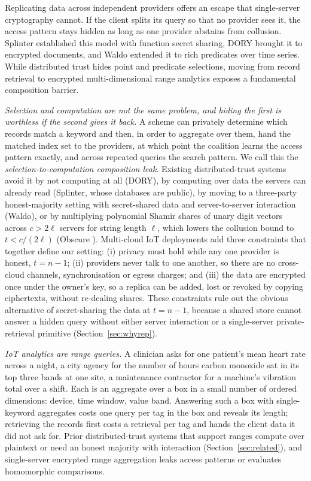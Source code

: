 \documentclass[a4paper,fleqn]{cas-sc}
\begin{document}
Replicating data across independent providers offers an escape that
single-server cryptography cannot. If the client splits its query so that no
provider sees it, the access pattern stays hidden as long as one provider
abstains from collusion. Splinter \citep{splinter} established this model with
function secret sharing, DORY \citep{dory} brought it to encrypted documents,
and Waldo \citep{waldo} extended it to rich predicates over time series. While distributed trust hides point and predicate selections, moving from
record retrieval to encrypted multi-dimensional range analytics exposes a
fundamental composition barrier.

\emph{Selection and computation are not the same problem, and hiding the first
is worthless if the second gives it back.} A scheme can privately determine
which records match a keyword and then, in order to aggregate over them, hand
the matched index set to the providers, at which point the coalition learns
the access pattern exactly, and across repeated queries the search pattern. We
call this the \emph{selection-to-computation composition leak}. Existing
distributed-trust systems avoid it by not computing at all (DORY), by
computing over data the servers can already read (Splinter, whose databases
are public), by moving to a three-party honest-majority setting with
secret-shared data and server-to-server interaction (Waldo), or by multiplying polynomial Shamir shares of unary digit vectors across
$c > 2\ell$ servers for string length $\ell$, which lowers the collusion bound
to $t < c/(2\ell)$ (Obscure \citep{gupta2019obscure,gupta2020obscure}). Multi-cloud IoT deployments add three
constraints that together define our setting: (i) privacy must hold while any
one provider is honest, $t=n-1$; (ii) providers never talk to one another, so
there are no cross-cloud channels, synchronisation or egress charges; and
(iii) the data are encrypted once under the owner's key, so a replica can be
added, lost or revoked by copying ciphertexts, without re-dealing shares.
These constraints rule out the obvious alternative of secret-sharing the data
at $t=n-1$, because a shared store cannot answer a hidden query without either
server interaction or a single-server private-retrieval primitive
(Section~\ref{sec:whyrep}).

\emph{IoT analytics are range queries.} A clinician asks for one patient's
mean heart rate across a night, a city agency for the number of hours carbon
monoxide sat in its top three bands at one site, a maintenance contractor for a
machine's vibration total over a shift. Each is an aggregate over a box in a
small number of ordered dimensions: device, time window, value band. Answering
such a box with single-keyword aggregates costs one query per tag in the box
and reveals its length; retrieving the records first costs a retrieval per tag
and hands the client data it did not ask for. Prior distributed-trust systems
that support ranges compute over plaintext or need an honest majority with
interaction (Section~\ref{sec:related}), and single-server encrypted range
aggregation leaks access patterns or evaluates homomorphic comparisons.
\end{document}

